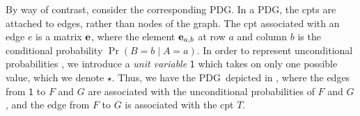 \documentclass{article}
\newcommand{\MN}{PDG}
\numberwithin{equation}{section}
\begin{document}
\begin{example}
		By way of contrast, consider the corresponding \MN. In a \MN, the cpts
		are attached to edges, rather than nodes of the graph.  
		The cpt associated with an edge $e$ is a matrix
		$\mathbf e$, where the element $\mathbf e_{a,b}$ at row $a$ and column $b$
		is the conditional probability $\Pr(B \!\!=\!\!b \mid A \!\!=\!\! a)$.  
		In order to represent unconditional probabilities%
		, we introduce a \emph{unit variable} $\mathsf 1$ %
		which takes on only one possible value,	which we denote $\star$.
%		
		Thus, we have the \MN\ depicted in , where the edges from $\mathsf 1$ to $F$ and $G$ are
		associated with the unconditional probabilities of $F$ and
		$G$, and the edge from $F$ to $G$ is associated with
		the cpt $T$.
		\begin{figure}[h]
			\centering
\end{figure}
\end{example}
\end{document}
